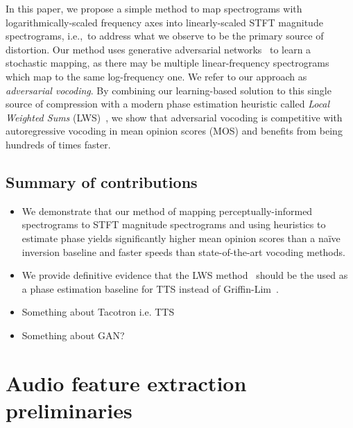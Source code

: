 \documentclass[a4paper]{article}
\begin{document}
In this paper, we propose a simple method to map spectrograms with logarithmically-scaled frequency axes into linearly-scaled STFT magnitude spectrograms, i.e.,~to address what we observe to be the primary source of distortion. 
Our method uses generative adversarial networks~\cite{goodfellow2014generative} to learn a stochastic mapping, as there may be multiple linear-frequency spectrograms which map to the same log-frequency one. 
We refer to our approach as \emph{adversarial vocoding}. 
By combining our learning-based solution to this single source of compression with a modern phase estimation heuristic called \emph{Local Weighted Sums} (LWS)~\cite{lws}, 
we show that adversarial vocoding is competitive with autoregressive vocoding in mean opinion scores (MOS) and benefits from being hundreds of times faster.

\subsection{Summary of contributions}

\begin{itemize}
    \item We demonstrate that our method of mapping perceptually-informed spectrograms to STFT magnitude spectrograms and using heuristics to estimate phase yields significantly higher mean opinion scores than a na\"ive inversion baseline and faster speeds than state-of-the-art vocoding methods.
    \item We provide definitive evidence that the LWS method~\cite{lws} should be the used as a phase estimation baseline for TTS instead of Griffin-Lim~\cite{griffinlim}. 
    \item Something about Tacotron i.e. TTS
    \item Something about GAN?
\end{itemize}

\section{Audio feature extraction preliminaries}
\end{document}
